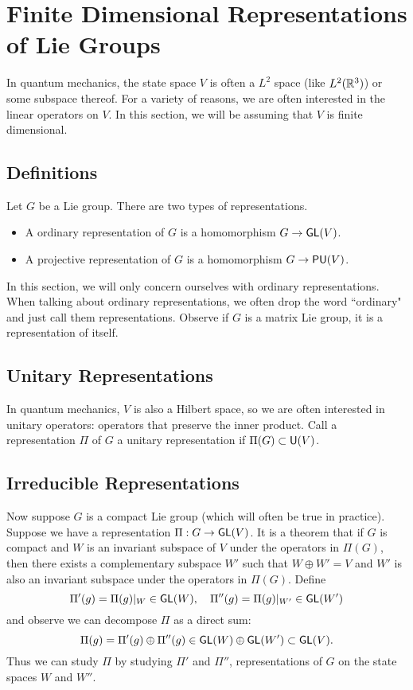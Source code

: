 \section{Finite Dimensional Representations of Lie Groups}
In quantum mechanics, the state space $V$ is often a $L^2$ space (like $L^2({\mathbb R}^3)$) or some subspace thereof. For a variety of reasons, we are often interested in the linear operators on $V$. In this section, we will be assuming that $V$ is finite dimensional.

\subsection{Definitions}
Let $G$ be a Lie group. There are two types of representations.
\begin{itemize}
    \item A ordinary representation of $G$ is a homomorphism $G \rightarrow \operatorname{\textsf{GL}}(V)$.
    \item A projective representation of $G$ is a homomorphism $G \rightarrow \operatorname{\textsf{PU}}(V)$.
\end{itemize}
In this section, we will only concern ourselves with ordinary representations. When talking about ordinary representations, we often drop the word ``ordinary" and just call them representations. Observe if $G$ is a matrix Lie group, it is a representation of itself.

\subsection{Unitary Representations}
In quantum mechanics, $V$ is also a Hilbert space, so we are often interested in unitary operators: operators that preserve the inner product. Call a representation $\Pi$ of $G$ a unitary representation if $\Pi(G) \subset \operatorname{\textsf{U}}(V)$.

\subsection{Irreducible Representations}
Now suppose $G$ is a compact Lie group (which will often be true in practice). Suppose we have a representation $\Pi: G \rightarrow \operatorname{\textsf{GL}}(V)$. It is a theorem that if $G$ is compact and $W$ is an invariant subspace of $V$ under the operators in $\Pi(G)$, then there exists a complementary subspace $W'$ such that $W \oplus W' = V$ and $W'$ is also an invariant subspace under the operators in $\Pi(G)$. Define
\[
    \Pi'(g) = \Pi(g)|_W \in \operatorname{\textsf{GL}}(W), \quad \Pi''(g) = \Pi(g)|_{W'} \in \operatorname{\textsf{GL}}(W')
\]
and observe we can decompose $\Pi$ as a direct sum:
\[
    \Pi(g) = \Pi'(g) \oplus \Pi''(g) \in \operatorname{\textsf{GL}}(W) \oplus \operatorname{\textsf{GL}}(W') \subset \operatorname{\textsf{GL}}(V).
\]
Thus we can study $\Pi$ by studying $\Pi'$ and $\Pi''$, representations of $G$ on the state spaces $W$ and $W''$.

